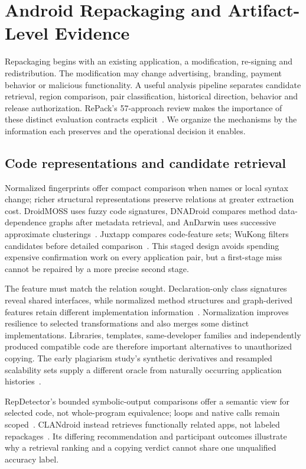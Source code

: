 \section{Android Repackaging and Artifact-Level Evidence}
\label{sec:repackaging}

Repackaging begins with an existing application, a modification, re-signing and redistribution. The modification may change advertising, branding, payment behavior or malicious functionality. A useful analysis pipeline separates candidate retrieval, region comparison, pair classification, historical direction, behavior and release authorization. RePack's 57-approach review makes the importance of these distinct evaluation contracts explicit~\cite{repack}. We organize the mechanisms by the information each preserves and the operational decision it enables.

\subsection{Code representations and candidate retrieval}

Normalized fingerprints offer compact comparison when names or local syntax change; richer structural representations preserve relations at greater extraction cost. DroidMOSS uses fuzzy code signatures, DNADroid compares method data-dependence graphs after metadata retrieval, and AnDarwin uses successive approximate clusterings~\cite{droidmoss,attackclones,andarwin}. Juxtapp compares code-feature sets; WuKong filters candidates before detailed comparison~\cite{juxtapp,wukong}. This staged design avoids spending expensive confirmation work on every application pair, but a first-stage miss cannot be repaired by a more precise second stage.

The feature must match the relation sought. Declaration-only class signatures reveal shared interfaces, while normalized method structures and graph-derived features retain different implementation information~\cite{reuseandroid,codematch,simidroid}. Normalization improves resilience to selected transformations and also merges some distinct implementations. Libraries, templates, same-developer families and independently produced compatible code are therefore important alternatives to unauthorized copying. The early plagiarism study's synthetic derivatives and resampled scalability sets supply a different oracle from naturally occurring application histories~\cite{plagiarizing}.

RepDetector's bounded symbolic-output comparisons offer a semantic view for selected code, not whole-program equivalence; loops and native calls remain scoped~\cite{semanticsrepack}. CLANdroid instead retrieves functionally related apps, not labeled repackages~\cite{similarapps}. Its differing recommendation and participant outcomes illustrate why a retrieval ranking and a copying verdict cannot share one unqualified accuracy label.

